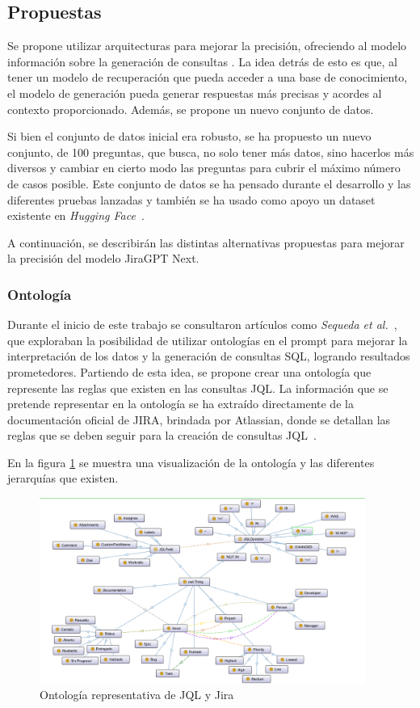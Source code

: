 \subsection{Propuestas}
Se propone utilizar arquitecturas  para mejorar la precisión, ofreciendo al modelo información sobre la generación de consultas . La idea detrás de esto es que, al tener un modelo de recuperación que pueda acceder a una base de conocimiento, el modelo de generación pueda generar respuestas más precisas y acordes al contexto proporcionado. Además, se propone un nuevo conjunto de datos.

Si bien el conjunto de datos inicial era robusto, se ha propuesto un nuevo conjunto, de 100 preguntas, que busca, no solo tener más datos, sino hacerlos más diversos y cambiar en cierto modo las preguntas para cubrir el máximo número de casos posible. Este conjunto de datos se ha pensado durante el desarrollo y las diferentes pruebas lanzadas y también se ha usado como apoyo un dataset existente en \textit{Hugging Face}~\cite{datasetHF}.

A continuación, se describirán las distintas alternativas propuestas para mejorar la precisión del modelo JiraGPT Next.

\subsubsection{Ontología}
Durante el inicio de este trabajo se consultaron artículos como \textit{Sequeda et al.}~\cite{sequeda2023benchmark}, que exploraban la posibilidad de utilizar ontologías en el prompt para mejorar la interpretación de los datos y la generación de consultas SQL, logrando resultados prometedores. Partiendo de esta idea, se propone crear una ontología que represente las reglas que existen en las consultas JQL. La información que se pretende representar en la ontología se ha extraído directamente de la documentación oficial de JIRA, brindada por Atlassian, donde se detallan las reglas que se deben seguir para la creación de consultas JQL~\cite{jiradocs}.

En la figura \ref{fig:diagrama_ontologia} se muestra una visualización de la ontología y las diferentes jerarquías que existen.
\begin{figure}[H]
    \centering
    \includegraphics[width=0.95\textwidth]{images/ontologia_visualizacion.png}
    \caption{Ontología representativa de JQL y Jira}\label{fig:diagrama_ontologia}
\end{figure}

